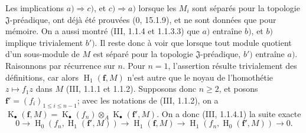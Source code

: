 Les implications $a)\Rightarrow c)$, et $c)\Rightarrow a)$ lorsque les $M_i$ sont séparés pour la topologie $\mathfrak J$-préadique, ont déjà été prouvées ($0$, 15.1.9), et ne sont données que pour mémoire. On a aussi montré (III, 1.1.4 et 1.1.3.3) que $a)$ entraîne $b)$, et $b)$ implique trivialement $b')$. Il reste donc à voir que lorsque tout module quotient d'un sous-module de $M$ est séparé pour la topologie $\mathfrak J$-préadique, $b')$ entraîne $a)$. Raisonnons par récurrence sur $n$. Pour $n=1$, l'assertion résulte trivialement des définitions, car alors $\operatorname{H}_1(\mathbf f,M)$ n'est autre que le noyau de l'homothétie $z\mapsto f_1z$ dans $M$ (III, 1.1.1 et 1.1.2). Supposons donc $n\geq2$, et posons $\mathbf f'=(f_i)_{1\leq i\leq n-1}$; avec les notations de (III, 1.1.2), on a $\operatorname{K}_\bullet(\mathbf f,M)=\operatorname{K}_\bullet(f_n)\otimes_A\operatorname{K}_\bullet(\mathbf f',M)$. On a donc (III, 1.1.4.1) la suite exacte
\begin{equation}
  0\longrightarrow\operatorname{H}_0(f_n,\operatorname{H}_1(\mathbf f',M))\longrightarrow\operatorname{H}_1(\mathbf f,M)\longrightarrow\operatorname{H}_1(f_n,\operatorname{H}_0(\mathbf f',M))\longrightarrow0.
  \tag{19.5.1.1}\label{IV.19.5.1.1}
\end{equation}

